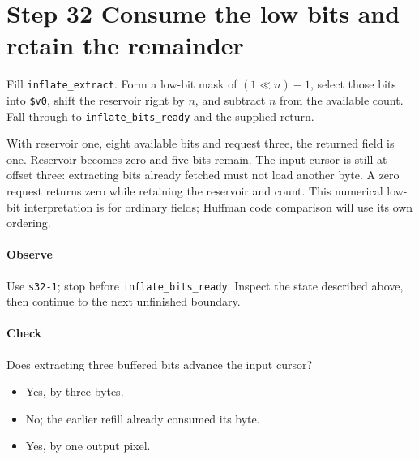 \section{Step 32 Consume the low bits and retain the remainder}\label{png-inflate-s32}
Fill \texttt{inflate\_extract}. Form a low-bit mask of $(1\ll n)-1$, select those bits into \texttt{\$v0}, shift the reservoir right by $n$, and subtract $n$ from the available count. Fall through to \texttt{inflate\_bits\_ready} and the supplied return.

With reservoir one, eight available bits and request three, the returned field is one. Reservoir becomes zero and five bits remain. The input cursor is still at offset three: extracting bits already fetched must not load another byte. A zero request returns zero while retaining the reservoir and count. This numerical low-bit interpretation is for ordinary fields; Huffman code comparison will use its own ordering.

\paragraph{Observe} Use \texttt{s32-1}; stop before \texttt{inflate\_bits\_ready}. Inspect the state described above, then continue to the next unfinished boundary.

\paragraph{Check} Does extracting three buffered bits advance the input cursor?
\begin{itemize}
\item[A.] Yes, by three bytes.
\item[B.] No; the earlier refill already consumed its byte.
\item[C.] Yes, by one output pixel.
\end{itemize}
